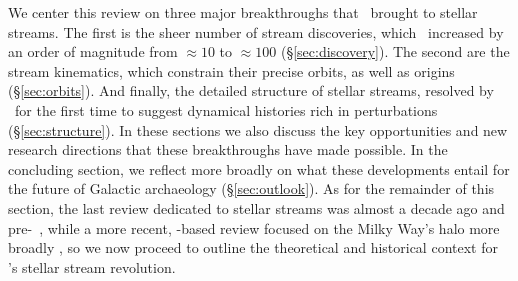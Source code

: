 \documentclass[final,5p,times,twocolumn,authoryear]{elsarticle}
\begin{document}
We center this review on three major breakthroughs that \gaia\ brought to stellar streams.
The first is the sheer number of  stream discoveries, which \gaia\ increased by an order of magnitude from $\approx10$ to $\approx100$ (\S\ref{sec:discovery}).
The second are the stream kinematics, which constrain their precise orbits, as well as
origins (\S\ref{sec:orbits}).
And finally, the detailed structure of stellar streams, resolved by \gaia\ for the first
time to suggest dynamical histories rich in perturbations (\S\ref{sec:structure}).
In these sections we also discuss the key opportunities and new research directions that these breakthroughs have made possible.
In the concluding section, we reflect more broadly on what these developments entail for the future of Galactic archaeology (\S\ref{sec:outlook}).
As for the remainder of this section, the last review dedicated to stellar streams was almost a decade ago and pre-\gaia\ \citep{newberg:2016}, while a more recent, \gaia-based review focused on the Milky Way's halo more broadly \citep{helmi:2020}, so we now proceed to outline the theoretical and historical context for \gaia's stellar stream revolution.
\end{document}
